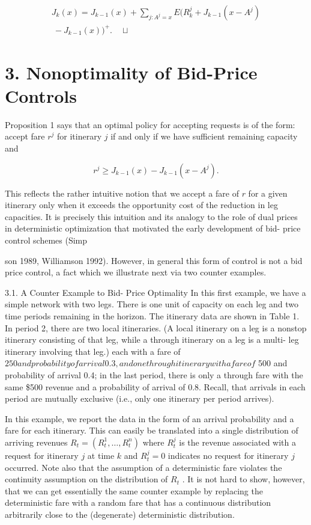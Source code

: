\[
\begin{array}{l}{{J_{k}(x)=J_{k-1}(x)+\sum_{j:A^{j}=x}E(R_{k}^{j}+J_{k-1}(x-A^{j})}}\\ {{\mathrm{~}-J_{k-1}(x))^{+}.\quad\sqcup}}\end{array} \tag{5}
\]

\section{3. Nonoptimality of Bid-Price
Controls}\label{nonoptimality-of-bid-price-controls}

Proposition 1 says that an optimal policy for accepting requests is of
the form: accept fare \(r^{j}\) for itinerary \(j\) if and only if we
have sufficient remaining capacity and

\[
r^{j}\geq J_{k - 1}(x) - J_{k - 1}(x - A^{j}).
\]

This reflects the rather intuitive notion that we accept a fare of \(r\)
for a given itinerary only when it exceeds the opportunity cost of the
reduction in leg capacities. It is precisely this intuition and its
analogy to the role of dual prices in deterministic optimization that
motivated the early development of bid- price control schemes (Simp

son 1989, Williamson 1992). However, in general this form of control is
not a bid price control, a fact which we illustrate next via two counter
examples.

3.1. A Counter Example to Bid- Price Optimality In this first example,
we have a simple network with two legs. There is one unit of capacity on
each leg and two time periods remaining in the horizon. The itinerary
data are shown in Table 1. In period 2, there are two local itineraries.
(A local itinerary on a leg is a nonstop itinerary consisting of that
leg, while a through itinerary on a leg is a multi- leg itinerary
involving that leg.) each with a fare of
\(250 and probability of arrival 0.3, and one through itinerary with a fare of\)
500 and probability of arrival 0.4; in the last period, there is only a
through fare with the same \$500 revenue and a probability of arrival of
0.8. Recall, that arrivals in each period are mutually exclusive (i.e.,
only one itinerary per period arrives).

In this example, we report the data in the form of an arrival
probability and a fare for each itinerary. This can easily be translated
into a single distribution of arriving revenues
\(R_{t} = (R_{t}^{1}, \ldots , R_{t}^{n})\) where \(R_{t}^{j}\) is the
revenue associated with a request for itinerary \(j\) at time \(k\) and
\(R_{t}^{j} = 0\) indicates no request for itinerary \(j\) occurred.
Note also that the assumption of a deterministic fare violates the
continuity assumption on the distribution of \(R_{t}\) . It is not hard
to show, however, that we can get essentially the same counter example
by replacing the deterministic fare with a random fare that has a
continuous distribution arbitrarily close to the (degenerate)
deterministic distribution.

